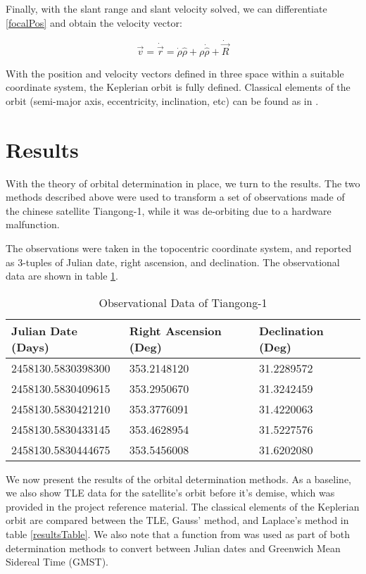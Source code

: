 \documentclass[11pt,twoside,letterpaper]{article}
\begin{document}
  Finally, with the slant range and slant velocity solved, we can
  differentiate \ref{focalPos} and obtain the velocity vector:

  \begin{equation}\label{focalVel}
    \vec{v} = \dot{\vec{r}} =
    \dot{\rho}\hat{\rho} + \rho\dot{\hat{\rho}} + \dot{\vec{R}}
  \end{equation}

  With the position and velocity vectors defined in three space within
  a suitable coordinate system, the Keplerian orbit is fully
  defined. Classical elements of the orbit (semi-major axis,
  eccentricity, inclination, etc) can be found as in \cite{kluever_2018}.

  \section{Results}
  With the theory of orbital determination in place, we turn to the
  results. The two methods described above were used to transform a
  set of observations made of the chinese satellite Tiangong-1, while
  it was de-orbiting due to a hardware malfunction.

  The observations were taken in the topocentric coordinate system,
  and reported as 3-tuples of Julian date, right ascension, and
  declination. The observational data are shown in table
  \ref{observations}.

  \begin{table}
    \centering
    \begin{tabular}{|l|l|l|}
      \hline
      Julian Date (Days)& Right Ascension (Deg)& Declination (Deg)\\ \hline
      2458130.5830398300 & 353.2148120 & 31.2289572 \\ \hline
      2458130.5830409615 & 353.2950670 & 31.3242459 \\ \hline
      2458130.5830421210 & 353.3776091 & 31.4220063 \\ \hline
      2458130.5830433145 & 353.4628954 & 31.5227576 \\ \hline
      2458130.5830444675 & 353.5456008 & 31.6202080 \\ \hline
    \end{tabular}
    \caption{Observational Data of Tiangong-1}
    \label{observations}
  \end{table}

  We now present the results of the orbital determination methods. As
  a baseline, we also show TLE data for the satellite's orbit before
  it's demise, which was provided in the project reference
  material. The classical elements of the Keplerian orbit are compared
  between the TLE, Gauss' method, and Laplace's method in table
  \ref{resultsTable}. We also note that a function from
  \cite{koblick_2010} was used as part of both determination methods
  to convert between Julian dates and Greenwich Mean Sidereal Time
  (GMST).
\end{document}

